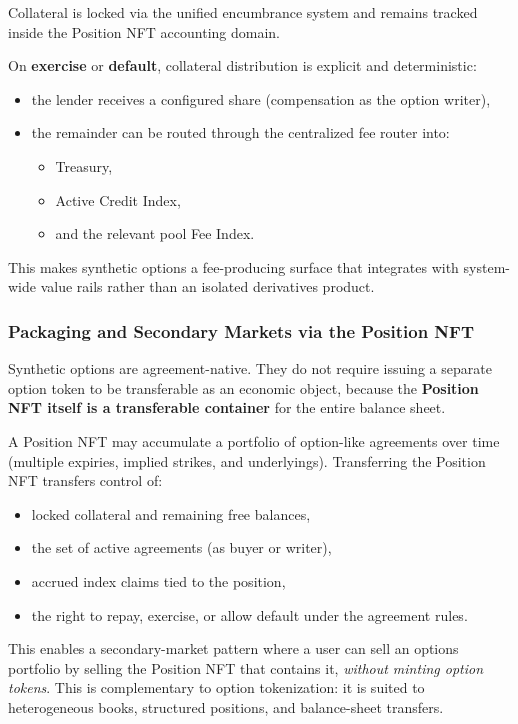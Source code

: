 \documentclass[version=preprint]{iacrcc}
\begin{document}
Collateral is locked via the unified encumbrance system and remains tracked inside the Position NFT accounting domain.

On \textbf{exercise} or \textbf{default}, collateral distribution is explicit and deterministic:
\begin{itemize}
  \item the lender receives a configured share (compensation as the option writer),
  \item the remainder can be routed through the centralized fee router into:
    \begin{itemize}
      \item Treasury,
      \item Active Credit Index,
      \item and the relevant pool Fee Index.
    \end{itemize}
\end{itemize}

This makes synthetic options a fee-producing surface that integrates with system-wide value rails rather than an isolated derivatives product.

\subsubsection{Packaging and Secondary Markets via the Position NFT}

Synthetic options are agreement-native. They do not require issuing a separate option token to be transferable as an economic object, because the \textbf{Position NFT itself is a transferable container} for the entire balance sheet.

A Position NFT may accumulate a portfolio of option-like agreements over time (multiple expiries, implied strikes, and underlyings). Transferring the Position NFT transfers control of:
\begin{itemize}
  \item locked collateral and remaining free balances,
  \item the set of active agreements (as buyer or writer),
  \item accrued index claims tied to the position,
  \item the right to repay, exercise, or allow default under the agreement rules.
\end{itemize}

This enables a secondary-market pattern where a user can sell an options portfolio by selling the Position NFT that contains it, \emph{without minting option tokens}. This is complementary to option tokenization: it is suited to heterogeneous books, structured positions, and balance-sheet transfers.
\end{document}
